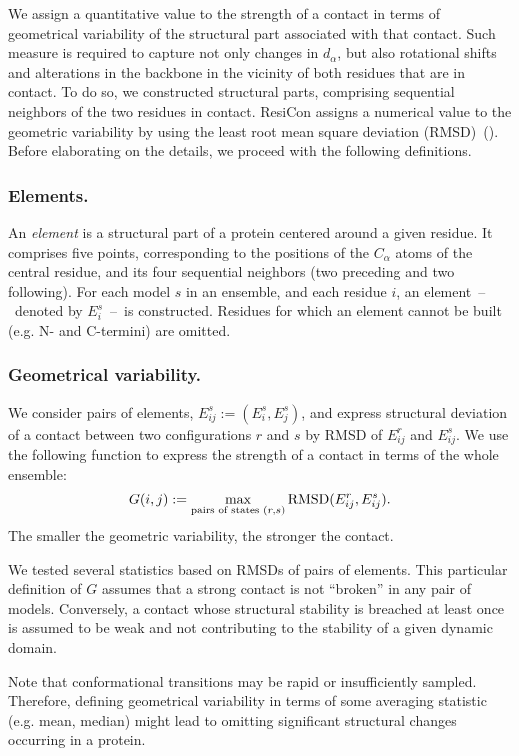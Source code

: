 \documentclass[a4paper,11pt,twoside]{book}%
\begin{document}
We assign a quantitative value to the strength of a contact in terms of geometrical variability of the structural part associated with that contact.
Such measure is required to capture not only changes in $d_\alpha$, but also rotational shifts and alterations in the backbone in the vicinity of both residues that are in contact.
To do so, we constructed structural parts, comprising sequential neighbors of the two residues in contact.
ResiCon assigns a numerical value to the geometric variability by using the least root mean square deviation (RMSD)~(\cite{kabsch1976solution}).
Before elaborating on the details, we proceed with the following definitions.

\subsubsection*{Elements.}
An \emph{element} is a structural part of a protein centered around a given residue.
It comprises five points, corresponding to the positions of the $C_\alpha$ atoms of the central residue, and its four sequential neighbors (two preceding and two following).
For each model $s$ in an ensemble, and each residue $i$, an element~--~denoted by $E_i^s$~--~is constructed.
Residues for which an element cannot be built (e.g. N- and C-termini) are omitted.

\subsubsection*{Geometrical variability.}
We consider pairs of elements, $E_{ij}^s := ( E_i^s , E_j^s )$, and express structural deviation of a contact between two configurations $r$ and $s$ by RMSD of $E_{ij}^r$ and $E_{ij}^s$.
We use the following function to express the strength of a contact in terms of the whole ensemble:
\begin{displaymath}
G(i,j) := \max_{\text{pairs of states }\\(r,s)} \text{RMSD}(E_{ij}^r,E_{ij}^s) .
\end{displaymath}
The smaller the geometric variability, the stronger the contact.

We tested several statistics based on RMSDs of pairs of elements.
This particular definition of $G$ assumes that a strong contact is not ``broken'' in any pair of models.
Conversely, a contact whose structural stability is breached at least once is assumed to be weak and not contributing to the stability of a given dynamic domain.

Note that conformational transitions may be rapid or insufficiently sampled.
Therefore, defining geometrical variability in terms of some averaging statistic (e.g. mean, median) might lead to omitting significant structural changes occurring in a protein.
\end{document}
